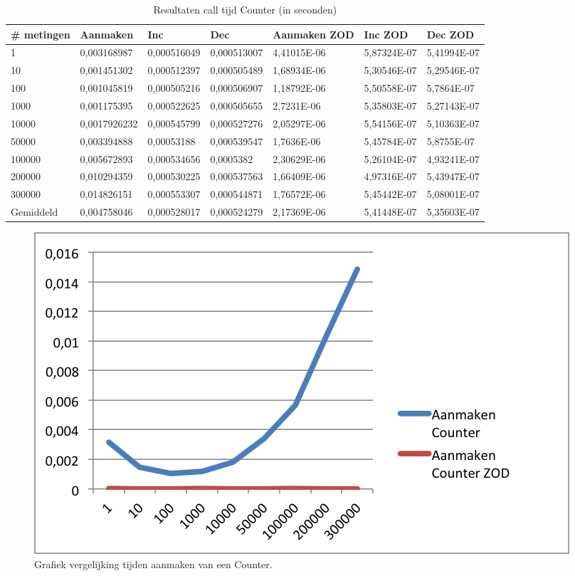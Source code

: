 \begin{table}
\centering
\begin{tabular}{|l|l|l|l|l|l|l|}
\hline
\# metingen   & Aanmaken     & Inc         & Dec         & Aanmaken ZOD & Inc ZOD     & Dec ZOD     \\ \hline
1         & 0,003168987  & 0,000516049 & 0,000513007 & 4,41015E-06  & 5,87324E-07 & 5,41994E-07 \\ \hline
10        & 0,001451302  & 0,000512397 & 0,000505489 & 1,68934E-06  & 5,30546E-07 & 5,29546E-07 \\ \hline
100       & 0,001045819  & 0,000505216 & 0,000506907 & 1,18792E-06  & 5,50558E-07 & 5,7864E-07  \\ \hline
1000      & 0,001175395  & 0,000522625 & 0,000505655 & 2,7231E-06   & 5,35803E-07 & 5,27143E-07 \\ \hline
10000     & 0,0017926232 & 0,000545799 & 0,000527276 & 2,05297E-06  & 5,54156E-07 & 5,10363E-07 \\ \hline
50000     & 0,003394888  & 0,00053188  & 0,000539547 & 1,7636E-06   & 5,45784E-07 & 5,8755E-07  \\ \hline
100000    & 0,005672893  & 0,000534656 & 0,0005382   & 2,30629E-06  & 5,26104E-07 & 4,93241E-07 \\ \hline
200000    & 0,010294359  & 0,000530225 & 0,000537563 & 1,66409E-06  & 4,97316E-07 & 5,43947E-07 \\ \hline
300000    & 0,014826151  & 0,000553307 & 0,000544871 & 1,76572E-06  & 5,45442E-07 & 5,08001E-07 \\ \hline
Gemiddeld & 0,004758046  & 0,000528017 & 0,000524279 & 2,17369E-06  & 5,41448E-07 & 5,35603E-07 \\ \hline
\end{tabular}
\caption{Resultaten call tijd Counter (in seconden)}
\label{Table:Counter}
\end{table}

\begin{figure}[!h]
  \centering
  \includegraphics[scale=1.0]{Afbeeldingen/Evaluatie/AanmakenCounter}
  \caption{Grafiek vergelijking tijden aanmaken van een Counter.}
  \label{fig:GraphCounter}
\end{figure}

